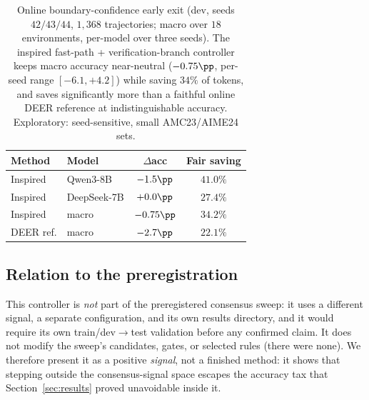 \begin{table}[t]
  \centering\small
  \begin{tabular}{llcc}
    \toprule
    Method & Model & $\Delta$acc & Fair saving \\
    \midrule
    Inspired  & Qwen3-8B    & $-1.5\pp$ & $41.0\%$ \\
    Inspired  & DeepSeek-7B & $+0.0\pp$ & $27.4\%$ \\
    Inspired  & macro       & $-0.75\pp$ & $34.2\%$ \\
    \midrule
    DEER ref. & macro       & $-2.7\pp$ & $22.1\%$ \\
    \bottomrule
  \end{tabular}
  \caption{Online boundary-confidence early exit (dev, seeds $42/43/44$,
  $1{,}368$ trajectories; macro over $18$ environments, per-model over three
  seeds). The inspired fast-path + verification-branch controller keeps macro
  accuracy near-neutral ($-0.75\pp$, per-seed range $[-6.1,+4.2]$) while saving
  $34\%$ of tokens, and saves significantly more than a faithful online DEER
  reference at indistinguishable accuracy. Exploratory: seed-sensitive, small
  AMC23/AIME24 sets.}
  \label{tab:boundary}
\end{table}

\subsection{Relation to the preregistration}
This controller is \emph{not} part of the preregistered consensus sweep: it uses
a different signal, a separate configuration, and its own results directory, and
it would require its own train/dev$\rightarrow$test validation before any
confirmed claim. It does not modify the sweep's candidates, gates, or selected
rules (there were none). We therefore present it as a positive \emph{signal},
not a finished method: it shows that stepping outside the consensus-signal space
escapes the accuracy tax that Section~\ref{sec:results} proved unavoidable
inside it.
